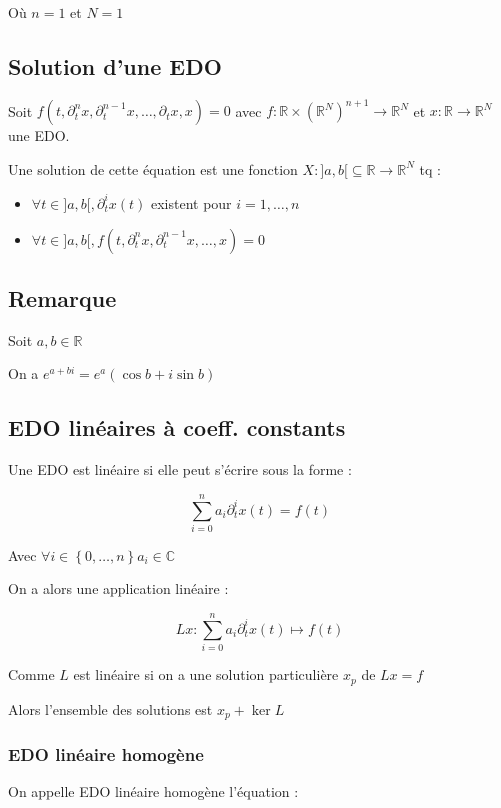 \documentclass[a4paper,10pt]{article}
\newcommand{\ap}{\rightarrow}
\newcommand{\R}{\mathbb{R}}
\newcommand{\C}{\mathbb{C}}
\newcommand{\eqdo}{EDO }
\begin{document}
Où $n = 1$ et $N = 1$

\subsection{Solution d'une EDO}

Soit $f\left(t, \partial^n_t x,\partial^{n-1}_t x,\dots,\partial_t x,x \right) = 0$ avec $f : \R \times (\R^N)^{n+1} \ap \R^N$ et $x : \R \ap \R^N$ une EDO.

Une solution de cette équation est une fonction $X:]a,b[ \subseteq \R \ap \R^N$ tq :

\begin{itemize}
	\item{$\forall t \in ]a,b[, \partial_t^i x(t)$ existent pour $i=1,\dots,n$}
	\item{$\forall t \in ]a,b[, f\left( t,\partial_t^n x, \partial_t^{n-1} x, \dots,x\right) = 0$} 
\end{itemize}


\subsection{Remarque}

Soit $a,b \in \R$

On a $e^{a+bi} = e^a (\cos b + i \sin b)$


\subsection{EDO linéaires à coeff. constants}

Une EDO est linéaire si elle peut s'écrire sous la forme :

$$\sum_{i=0}^n a_i \partial^i_t x(t) = f(t)$$

Avec $\forall i \in \left\{0,\dots,n \right\} a_i \in \C$

On a alors une application linéaire :

$$Lx : \sum_{i=0}^n a_i \partial^i_t x(t) \mapsto f(t)$$

Comme $L$ est linéaire si on a une solution particulière $x_p$ de $Lx = f$

Alors l'ensemble des solutions est $x_p + \ker L$

\subsubsection{EDO linéaire homogène }

On appelle \eqdo linéaire homogène l'équation :
\end{document}

